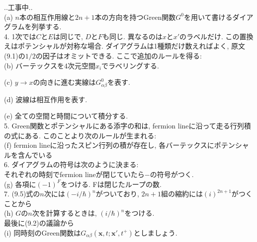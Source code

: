 \documentclass[10.5pt,a4paper]{jreport}
\newcommand{\bx}{\bm{x}}
\begin{document}
..工事中..\\

(a) $n$本の相互作用線と$2n + 1$本の方向を持つGreen関数$G^0$を用いて書けるダイアグラムを列挙する.\\

4. 1次では$C$と$E$は同じで, $D$と$F$も同じ. 異なるのは$x$と$x'$のラベルだけ. この置換えはポテンシャルが対称な場合. ダイアグラムは1種類だけ数えればよく, 原文(9.1)の$1/2$の因子はオミットできる.
ここで追加のルールを得る:\\

(b) バーテックスを4次元空間$x_i$でラベリングする. 

(c) $y\rightarrow x$の向きに進む実線は$G_{\alpha\beta}^0$を表す.

(d) 波線は相互作用を表す.

(e) 全ての空間と時間について積分する.\\

5. Green関数とポテンシャルにある添字の和は, fermion lineに沿って走る行列積の式にある. このことより次のルールが生まれる:\\ 

(f) fermion lineに沿ったスピン行列の積が存在し, 各バーテックスにポテンシャルを含んでいる\\

6. ダイアグラムの符号は次のように決まる:\\

それぞれの時刻でfermion lineが閉じていたら$-$の符号がつく. \\

(g) 各項に$(-1)^F$をつける. Fは閉じたループの数. \\

7. (9.5)式の$n$次には$(-i/\hbar)^n$がついており, $2n+1$組の縮約には$(i)^{2n+1}$がつくことから\\

(h) $G$の$n$次を計算するときは, $(i/\hbar)^n$をつける. \\

最後に(9.2)の議論から\\

(i) 同時刻のGreen関数は$G_{\alpha\beta}(\bx, t; \bx', t^+)$としましょう.
\end{document}
